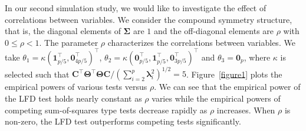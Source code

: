 \documentclass[12pt]{article} %
\newcommand{\bC}{\mathbf{C}}
\newcommand{\bfsym}[1]{\ensuremath{\boldsymbol{#1}}}
\def\blambda {\bfsym {\lambda}}
\def\bSigma {\bfsym {\Sigma}}
\def\bTheta {\bfsym {\Theta}}
\theoremstyle{definition}
\begin{document}
In our second simulation study, we would like to investigate the effect of correlations between variables.
We consider the compound symmetry structure, that is, the diagonal elements of $\bSigma$ are $1$ and the off-diagonal elements are $\rho$ with $0\leq \rho<1$.
The parameter $\rho$ characterizes the correlations between variables.
We take 
$\theta_1=\kappa (\mathbf 1_{p/5}^\top,\mathbf{0}_{4p/5}^\top)^\top$, $\theta_2=\kappa (\mathbf{0}_{p/5}^\top, \mathbf 1_{p/5}^\top,\mathbf{0}_{3p/5}^\top)^\top$
and $\theta_3=\mathbf{0}_p$, where $\kappa$ is selected such that ${ \bC^\top \bTheta^\top \bTheta\bC}/(\sum_{i=2}^p\blambda_i^2)^{1/2}=5$.
Figure~\ref{figure1} plots the empirical powers of various tests versus $\rho$.
We can see that the empirical power of the LFD test holds nearly constant as $\rho$ varies while the empirical powers of competing sum-of-squares type tests decrease rapidly as $\rho$ increases.
When $\rho$ is non-zero, the LFD test outperforms competing tests significantly.
\end{document}
